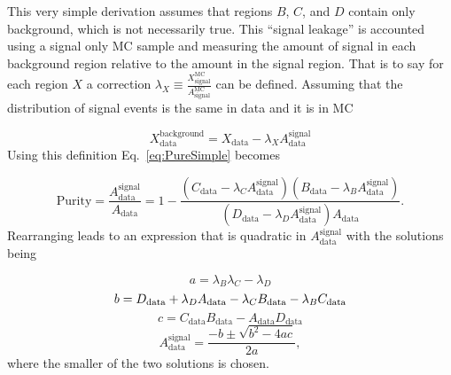 This very simple derivation assumes that regions $B$, $C$, and $D$ contain only background, which is not necessarily true.  
This ``signal leakage'' is accounted using a signal only MC sample and measuring the amount of signal in each background region relative to the amount in the signal region.  
That is to say for each region $X$ a correction $\lambda_X\equiv\frac{X_{\mathrm{signal}}^{\mathrm{MC}}}{A_{\mathrm{signal}}^{\mathrm{MC}}}$ can be defined.  
Assuming that the distribution of signal events is the same in data and it is in MC

\begin{equation}
 X_{\mathrm{data}}^{\mathrm{background}} = X_{\mathrm{data}} - \lambda_XA_{\mathrm{data}}^{\mathrm{signal}}
\end{equation}
\noindent
Using this definition Eq.~\ref{eq:PureSimple} becomes

\begin{equation}
 \label{eq:PureLeakage}
 \mathrm{Purity} = \frac{A_{\mathrm{data}}^{\mathrm{signal}}}{A_{\mathrm{data}}} = 1-\frac{\left(C_{\mathrm{data}}-\lambda_CA_{\mathrm{data}}^{\mathrm{signal}}\right)\left(B_{\mathrm{data}}-\lambda_BA_{\mathrm{data}}^{\mathrm{signal}}\right)}{\left(D_{\mathrm{data}}-\lambda_DA_{\mathrm{data}}^{\mathrm{signal}}\right)A_{\mathrm{data}}}.  
\end{equation}
\noindent
Rearranging leads to an expression that is quadratic in $A_{\mathrm{data}}^{\mathrm{signal}}$ with the solutions being

\begin{equation}
 a=\lambda_B\lambda_C-\lambda_D 
\end{equation}
\begin{equation}
 b=D_{\mathrm{data}}+\lambda_DA_{\mathrm{data}}-\lambda_CB_{\mathrm{data}}-\lambda_BC_{\mathrm{data}} \\
\end{equation}
\begin{equation}
 c=C_{\mathrm{data}}B_{\mathrm{data}}-A_{\mathrm{data}}D_{\mathrm{data}}
\end{equation}
\begin{equation}
 A_{\mathrm{data}}^{\mathrm{signal}} = \frac{-b\pm\sqrt{b^2-4ac}}{2a}, 
\end{equation}
\noindent 
where the smaller of the two solutions is chosen.  

